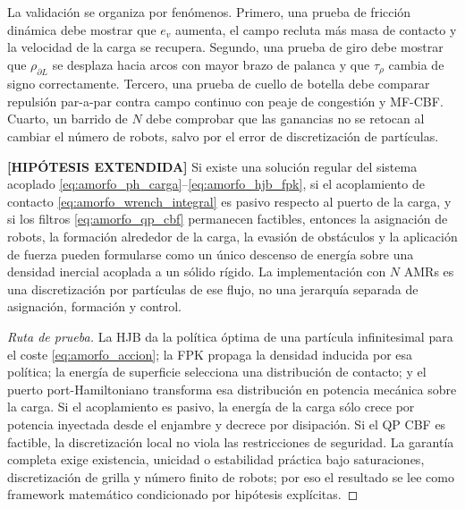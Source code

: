 La validación se organiza por fenómenos. Primero, una prueba de fricción dinámica debe
mostrar que $e_v$ aumenta, el campo recluta más masa de contacto y la velocidad de la
carga se recupera. Segundo, una prueba de giro debe mostrar que
$\rho_{\partial L}$ se desplaza hacia arcos con mayor brazo de palanca y que
$\tau_\rho$ cambia de signo correctamente. Tercero, una prueba de cuello de botella debe
comparar repulsión par-a-par contra campo continuo con peaje de congestión y MF-CBF.
Cuarto, un barrido de $N$ debe comprobar que las ganancias no se retocan al cambiar el
número de robots, salvo por el error de discretización de partículas.

\begin{teorema} \textbf{[HIPÓTESIS EXTENDIDA]}
\label{thm:transporte_amorfo_programa}
Si existe una solución regular del sistema acoplado
\eqref{eq:amorfo_ph_carga}--\eqref{eq:amorfo_hjb_fpk}, si el acoplamiento de contacto
\eqref{eq:amorfo_wrench_integral} es pasivo respecto al puerto de la carga, y si los
filtros \eqref{eq:amorfo_qp_cbf} permanecen factibles, entonces la asignación de robots,
la formación alrededor de la carga, la evasión de obstáculos y la aplicación de fuerza
pueden formularse como un único descenso de energía sobre una densidad inercial acoplada
a un sólido rígido. La implementación con $N$ AMRs es una discretización por partículas
de ese flujo, no una jerarquía separada de asignación, formación y control.
\end{teorema}

\begin{proof}[Ruta de prueba]
La HJB da la política óptima de una partícula infinitesimal para el coste
\eqref{eq:amorfo_accion}; la FPK propaga la densidad inducida por esa política; la
energía de superficie selecciona una distribución de contacto; y el puerto
port-Hamiltoniano transforma esa distribución en potencia mecánica sobre la carga. Si el
acoplamiento es pasivo, la energía de la carga sólo crece por potencia inyectada desde el
enjambre y decrece por disipación. Si el QP CBF es factible, la discretización local no
viola las restricciones de seguridad. La garantía completa exige existencia, unicidad o
estabilidad práctica bajo saturaciones, discretización de grilla y número finito de
robots; por eso el resultado se lee como framework matemático condicionado por hipótesis
explícitas.
\end{proof}
